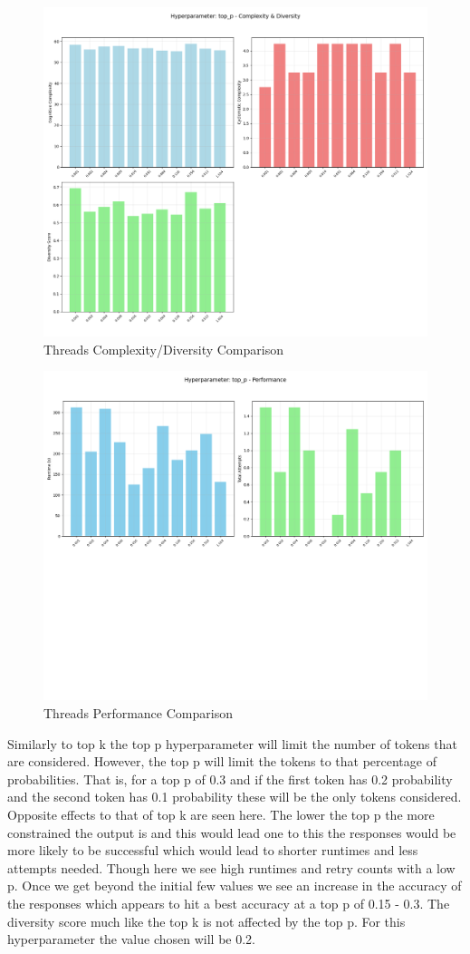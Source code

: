 \documentclass[12pt]{extarticle}
\begin{document}
\begin{figure}[H]
\centering
\includegraphics[width=0.7\linewidth]{Images/Hyperparam_top_p_Complexity.png}
\caption{Threads Complexity/Diversity Comparison}
\label{fig:Complexity_Comparison_Threads}
\end{figure}

\begin{figure}[H]
\centering
\includegraphics[width=0.7\linewidth]{Images/Hyperparam_top_p_Performance.png}
\caption{Threads Performance Comparison}
\label{fig:Complexity_Comparison_Threads}
\end{figure}

Similarly to top k the top p hyperparameter will limit the number of tokens that are considered. However, the top p will limit the tokens to that percentage of probabilities. That is, for a top p of 0.3 and if the first token has 0.2 probability and the second token has 0.1 probability these will be the only tokens considered. Opposite effects to that of top k are seen here. The lower the top p the more constrained the output is and this would lead one to this the responses would be more likely to be successful which would lead to shorter runtimes and less attempts needed. Though here we see high runtimes and retry counts with a low p. Once we get beyond the initial few values we see an increase in the accuracy of the responses which appears to hit a best accuracy at a top p of 0.15 - 0.3. The diversity score much like the top k is not affected by the top p. For this hyperparameter the value chosen will be 0.2.
\end{document}
